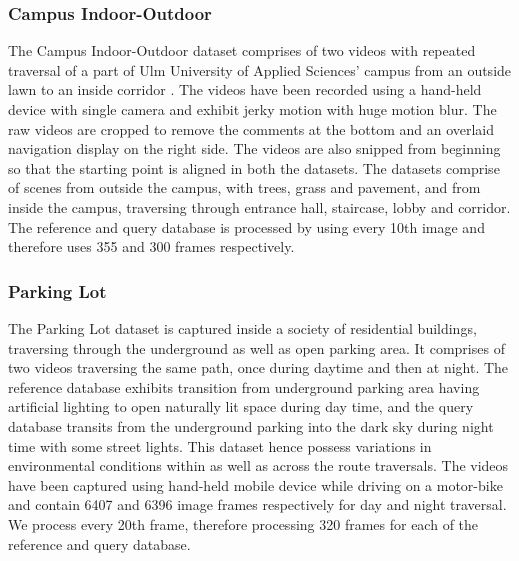 \documentclass[letterpaper, 10 pt, conference]{ieeeconf}  %
\begin{document}
\subsubsection{Campus Indoor-Outdoor}
The Campus Indoor-Outdoor dataset comprises of two videos with repeated traversal of a part of Ulm University of Applied Sciences' campus from an outside lawn to an inside corridor \cite{indoorOutdoor1}. The videos have been recorded using a hand-held device with single camera and exhibit jerky motion with huge motion blur. The raw videos are cropped to remove the comments at the bottom and an overlaid navigation display on the right side. The videos are also snipped from beginning so that the starting point is aligned in both the datasets. The datasets comprise of scenes from outside the campus, with trees, grass and pavement, and from inside the campus, traversing through entrance hall, staircase, lobby and corridor. The reference and query database is processed by using every 10th image and therefore uses 355 and 300 frames respectively.

\subsubsection{Parking Lot}
The Parking Lot dataset is captured inside a society of residential buildings, traversing through the underground as well as open parking area. It comprises of two videos traversing the same path, once during daytime and then at night. The reference database exhibits transition from underground parking area having artificial lighting to open naturally lit space during day time, and the query database transits from the underground parking into the dark sky during night time with some street lights. This dataset hence possess variations in environmental conditions within as well as across the route traversals. The videos have been captured using hand-held mobile device while driving on a motor-bike and contain 6407 and 6396 image frames respectively for day and night traversal. We process every 20th frame, therefore processing 320 frames for each of the reference and query database.
\end{document}
